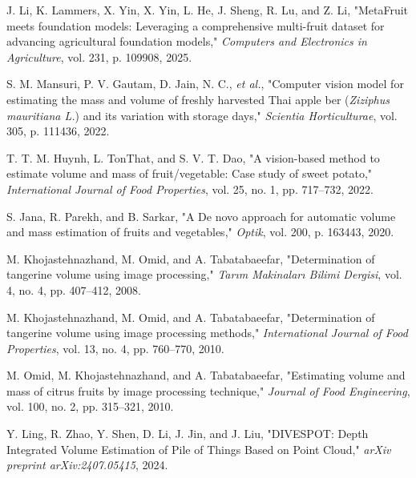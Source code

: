 \begin{thebibliography}{12}

 J. Li, K. Lammers, X. Yin, X. Yin, L. He, J. Sheng, R. Lu, and Z. Li,  
"MetaFruit meets foundation models: Leveraging a comprehensive multi-fruit dataset for advancing agricultural foundation models,"  
\textit{Computers and Electronics in Agriculture}, vol. 231, p. 109908, 2025.

 S. M. Mansuri, P. V. Gautam, D. Jain, N. C., \textit{et al.},  
"Computer vision model for estimating the mass and volume of freshly harvested Thai apple ber (\textit{Ziziphus mauritiana L.}) and its variation with storage days,"  
\textit{Scientia Horticulturae}, vol. 305, p. 111436, 2022.

 T. T. M. Huynh, L. TonThat, and S. V. T. Dao,  
"A vision-based method to estimate volume and mass of fruit/vegetable: Case study of sweet potato,"  
\textit{International Journal of Food Properties}, vol. 25, no. 1, pp. 717--732, 2022.

 S. Jana, R. Parekh, and B. Sarkar,  
"A De novo approach for automatic volume and mass estimation of fruits and vegetables,"  
\textit{Optik}, vol. 200, p. 163443, 2020.


M. Khojastehnazhand, M. Omid, and A. Tabatabaeefar,  
"Determination of tangerine volume using image processing,"  
\textit{Tarım Makinaları Bilimi Dergisi}, vol. 4, no. 4, pp. 407--412, 2008.  

M. Khojastehnazhand, M. Omid, and A. Tabatabaeefar,  
"Determination of tangerine volume using image processing methods,"  
\textit{International Journal of Food Properties}, vol. 13, no. 4, pp. 760--770, 2010.  


 M. Omid, M. Khojastehnazhand, and A. Tabatabaeefar,  
"Estimating volume and mass of citrus fruits by image processing technique,"  
\textit{Journal of Food Engineering}, vol. 100, no. 2, pp. 315--321, 2010.

 Y. Ling, R. Zhao, Y. Shen, D. Li, J. Jin, and J. Liu,  
"DIVESPOT: Depth Integrated Volume Estimation of Pile of Things Based on Point Cloud,"  
\textit{arXiv preprint arXiv:2407.05415}, 2024.


\end{thebibliography}
